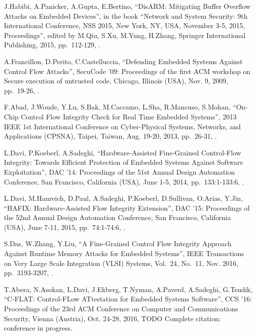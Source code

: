 \begin{thebibliography}{99}
J.Habibi, A.Panicker, A.Gupta, E.Bertino,
``DisARM: Mitigating Buffer Overflow Attacks on Embedded Devices'',
in the book ``Network and System Security: 9th International Conference, NSS 2015, New York, NY, USA, November 3-5, 2015, Proceedings'',
edited by M.Qiu, S.Xu, M.Yung, H.Zhang,
Springer International Publishing, 2015,
pp.\ 112-129,
.

A.Francillon, D.Perito, C.Castelluccia,
``Defending Embedded Systems Against Control Flow Attacks'',
SecuCode '09: Proceedings of the first ACM workshop on Secure execution of untrusted code,
Chicago, Illinois (USA), Nov. 9, 2009,
pp.\ 19-26,
.

F.Abad, J.Woude, Y.Lu, S.Bak, M.Caccamo, L.Sha, R.Mancuso, S.Mohan,
``On-Chip Control Flow Integrity Check for Real Time Embedded Systems'',
2013 IEEE 1st International Conference on Cyber-Physical Systems, Networks, and Applications (CPSNA),
Taipei, Taiwan, Aug. 19-20, 2013,
pp.\ 26-31,
.

L.Davi, P.Koeberl, A.Sadeghi,
``Hardware-Assisted Fine-Grained Control-Flow Integrity: Towards Efficient Protection of Embedded Systems Against Software Exploitation'',
DAC '14: Proceedings of the 51st Annual Design Automation Conference,
San Francisco, California (USA), June 1-5, 2014,
pp.\ 133:1-133:6,
.

L.Davi, M.Hanreich, D.Paul, A.Sadeghi, P.Koeberl, D.Sullivan, O.Arias, Y.Jin,
``HAFIX: Hardware-Assisted Flow Integrity Extension'',
DAC '15: Proceedings of the 52nd Annual Design Automation Conference,
San Francisco, California (USA), June 7-11, 2015,
pp.\ 74:1-74:6,
.

S.Das, W.Zhang, Y.Liu,
``A Fine-Grained Control Flow Integrity Approach Against Runtime Memory Attacks for Embedded Systems'',
IEEE Transactions on Very Large Scale Integration (VLSI) Systems,
Vol.\ 24, No.\ 11,
Nov. 2016,
pp.\ 3193-3207,
.

T.Abera, N.Asokan, L.Davi, J.Ekberg, T.Nyman, A.Paverd, A.Sadeghi, G.Tsudik,
``C-FLAT: Control-FLow ATtestation for Embedded Systems Software'',
CCS '16: Proceedings of the 23rd ACM Conference on Computer and Communications Security,
Vienna (Austria), Oct. 24-28, 2016,
TODO Complete citation: conference in progress.


\end{thebibliography}
